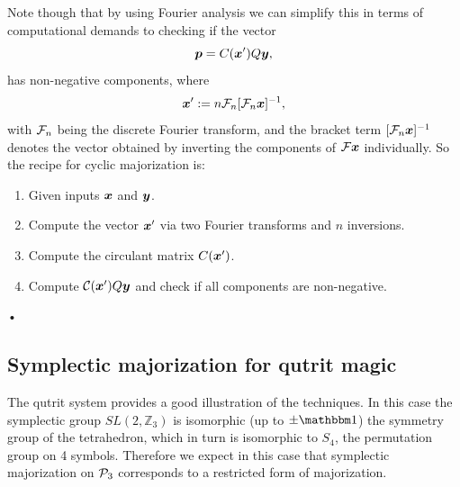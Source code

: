 \documentclass[pra,
aps,
twocolumn,
superscriptaddress,
groupedaddress,
nofootinbib,
reprint
]{revtex4-1}
\begin{document}
Note though that by using Fourier analysis we can simplify this in terms of computational demands to checking if the vector
\begin{equation}
\p = C(\x') Q\y,
\end{equation}
has non-negative components, where
\begin{equation}
\x' := n\F_n [\F_n\x]^{-1},
\end{equation}
with $\F_n$ being the discrete Fourier transform, and the bracket term $[\F_n \x]^{-1}$ denotes the vector obtained by inverting the components of $\F \x$ individually. So the recipe for cyclic majorization is:
\begin{enumerate}
\item Given inputs $\x$ and $\y$.
\item Compute the vector $\x'$ via two Fourier transforms and $n$ inversions.
\item Compute the circulant matrix $C(\x')$.
\item Compute $\C(\x')Q \y$ and check if all components are non-negative.
\end{enumerate}•


\subsection{Symplectic majorization for qutrit magic}
The qutrit system provides a good illustration of the techniques. In this case the symplectic group $SL(2,\mathbb{Z}_3)$ is isomorphic (up to $\pm \I$) the symmetry group of the tetrahedron, which in turn is isomorphic to $S_4$, the permutation group on 4 symbols. Therefore we expect in this case that symplectic majorization on $\P_3$ corresponds to a restricted form of majorization.
\end{document}
